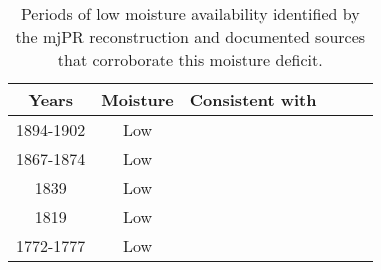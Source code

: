 \begin{landscape}
\begin{table}
  \begin{center}
    \begin{tabular}{cccccc}
\toprule
Years     & Moisture & Consistent with \\ \midrule
1894-1902 & Low & \cite{warrick1980drought, ruffner1998relating, droughtCali}\\
1867-1874 & Low & \cite{droughtCali}\\
1839      & Low & \\
1819      & Low & \cite{lawson2005desert}\\
1772-1777 & Low \\ \bottomrule
      \end{tabular}
  \end{center}
      \caption{Periods of low moisture availability identified by the mjPR reconstruction and documented sources that corroborate this moisture deficit.}
  \label{table:anoms}
  \vspace{2cm}
\end{table}
\end{landscape}

